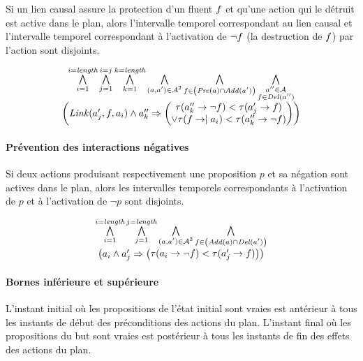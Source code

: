 Si un lien causal assure la protection d’un fluent $f$ et qu'une action qui le détruit est active dans le plan, alors l’intervalle temporel correspondant au lien causal et l’intervalle temporel correspondant à l’activation de $\neg f$ (la destruction de $f$) par l’action sont disjoints.

\[
\begin{matrix}
\bigwedge\limits_{\substack{i=1}}^{i=\textit{length}} \bigwedge\limits_{\substack{j=1}}^{i=j} \bigwedge\limits_{\substack{k=1}}^{k=\textit{length}} \bigwedge\limits_{\substack{(a,a')\in\mathcal{A}^{2}}} \bigwedge\limits_{\substack{f\in\left(\mathit{Pre}(a)\cap\mathit{Add}(a')\right)}} \bigwedge\limits_{\substack{a''\in\mathcal{A}\\f\in\mathit{Del}(a'')}}\\ \left( \mathit{Link}(a'_{j},f,a_{i}) \wedge a''_{k} \Rightarrow \left( \begin{matrix} \tau(a''_{k}\rightarrow\neg f) < \tau(a'_{j}\rightarrow f)\\ \vee \tau(f\rightarrow\mid a_{i}) < \tau(a''_{k}\rightarrow\neg f) \end{matrix} \right) \right)
\end{matrix}
\]

\paragraph{Prévention des interactions négatives}

Si deux actions produisant respectivement une proposition $p$ et sa négation sont actives dans le plan, alors les intervalles temporels correspondants à l’activation de $p$ et à l’activation de $\neg p$ sont disjoints.

\[
\begin{matrix}
\BigforallTwo{i=1}{i=\length} \BigforallTwo{j=1}{j=\length} \Bigforall{(\a,\b)\in\A^{2}} \Bigforall{\f\in\left(\Add{\a}\cap\Del{\b}\right)}\\ \left( \a_{i} \wedge \b_{j} \Rightarrow \left( \begin{matrix} \tau(\a_{i}\rightarrow\neg\f) < \tau(\b_{j}\rightarrow\f)%
\end{matrix} \right) \right)
\end{matrix}
\]

\paragraph{Bornes inférieure et supérieure}

L’instant initial où les propositions de l’état initial sont vraies est antérieur à tous les instants de début des préconditions des actions du plan. L’instant final où les propositions du but sont vraies est postérieur à tous les instants de fin des effets des actions du plan.
